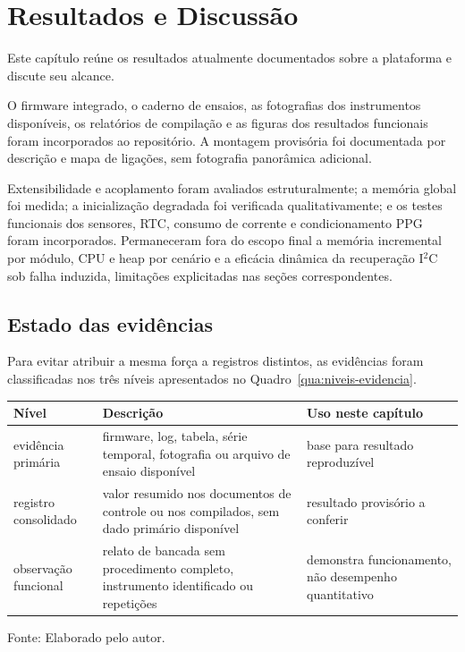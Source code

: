 \documentclass[a4paper,12pt]{article}
\newcommand{\fonteelemento}[1]{%
  \par\smallskip
  {\footnotesize\raggedright Fonte: #1.\par}%
}
\begin{document}
\section{Resultados e Discuss\~ao}


Este cap\'itulo re\'une os resultados atualmente documentados sobre a plataforma e discute seu alcance.


O firmware integrado, o caderno de ensaios, as fotografias dos instrumentos dispon\'iveis, os relat\'orios de compila\c{c}\~ao e as figuras dos resultados funcionais foram incorporados ao reposit\'orio. A montagem provis\'oria foi documentada por descri\c{c}\~ao e mapa de liga\c{c}\~oes, sem fotografia panor\^amica adicional.

Extensibilidade e acoplamento foram avaliados estruturalmente; a mem\'oria global foi medida; a inicializa\c{c}\~ao degradada foi verificada qualitativamente; e os testes funcionais dos sensores, RTC, consumo de corrente e condicionamento PPG foram incorporados. Permaneceram fora do escopo final a mem\'oria incremental por m\'odulo, CPU e heap por cen\'ario e a efic\'acia din\^amica da recupera\c{c}\~ao I$^2$C sob falha induzida, limita\c{c}\~oes explicitadas nas se\c{c}\~oes correspondentes.


\subsection{Estado das evid\^encias}


Para evitar atribuir a mesma for\c{c}a a registros distintos, as evid\^encias foram classificadas nos tr\^es n\'iveis apresentados no Quadro~\ref{qua:niveis-evidencia}.


\begin{quadro}[H]
\centering
\caption{Classifica\c{c}\~ao das evid\^encias empregadas}
\label{qua:niveis-evidencia}
\small
\begin{tabularx}{\textwidth}{|>{\raggedright\arraybackslash}p{}|>{\raggedright\arraybackslash}p{}|>{\raggedright\arraybackslash}X|}
\hline
\textbf{N\'ivel} & \textbf{Descri\c{c}\~ao} & \textbf{Uso neste cap\'itulo} \\
\hline
evid\^encia prim\'aria & firmware, log, tabela, s\'erie temporal, fotografia ou arquivo de ensaio dispon\'ivel & base para resultado reproduz\'ivel \\
\hline
registro consolidado & valor resumido nos documentos de controle ou nos compilados, sem dado prim\'ario dispon\'ivel & resultado provis\'orio a conferir \\
\hline
observa\c{c}\~ao funcional & relato de bancada sem procedimento completo, instrumento identificado ou repeti\c{c}\~oes & demonstra funcionamento, n\~ao desempenho quantitativo \\
\hline
\end{tabularx}
\fonteelemento{Elaborado pelo autor}
\end{quadro}
\end{document}
